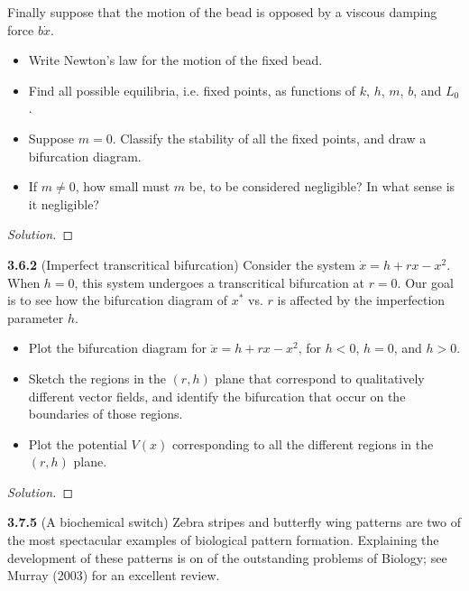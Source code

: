 \documentclass[10pt]{amsart}
\newenvironment{solution}
{\begin{proof}[Solution]}
{\end{proof}}
\begin{document}
\begin{onehalfspace}
        \noindent Finally suppose that the motion of the bead is opposed by a viscous damping force $b\dot{x}$.
        \begin{itemize}
            \item[a)] Write Newton's law for the motion of the fixed bead.
            \item[b)] Find all possible equilibria, i.e. fixed points, as functions of $k$, $h$, $m$, $b$, and $L_0$.
            \item[c)] Suppose $m = 0$.
            Classify the stability of all the fixed points, and draw a bifurcation diagram.
            \item[d)] If $m\neq 0$, how small must $m$ be, to be considered negligible?
            In what sense is it negligible?
        \end{itemize}

        \begin{solution}
        \end{solution}

        \noindent\textbf{3.6.2} (Imperfect transcritical bifurcation) Consider the system $\dot{x} = h + rx - x^2$.
        When $h = 0$, this system undergoes a transcritical bifurcation at $r = 0$.
        Our goal is to see how the bifurcation diagram of $x^*$ vs. $r$ is affected by the imperfection parameter $h$.
        \begin{itemize}
            \item[a)] Plot the bifurcation diagram for $\dot{x} = h + rx - x^2$, for $h < 0$, $h = 0$, and $h > 0$.
            \item[b)] Sketch the regions in the $(r,h)$ plane that correspond to qualitatively different vector fields,
            and identify the bifurcation that occur on the boundaries of those regions.
            \item[c)] Plot the potential $V(x)$ corresponding to all the different regions in the $(r,h)$ plane.
        \end{itemize}

        \begin{solution}
        \end{solution}

        \noindent\textbf{3.7.5} (A biochemical switch) Zebra stripes and butterfly wing patterns are two of the most
        spectacular examples of biological pattern formation.
        Explaining the development of these patterns is on of the outstanding problems of Biology; see Murray (2003)
        for an excellent review.


\end{onehalfspace}
\end{document}
